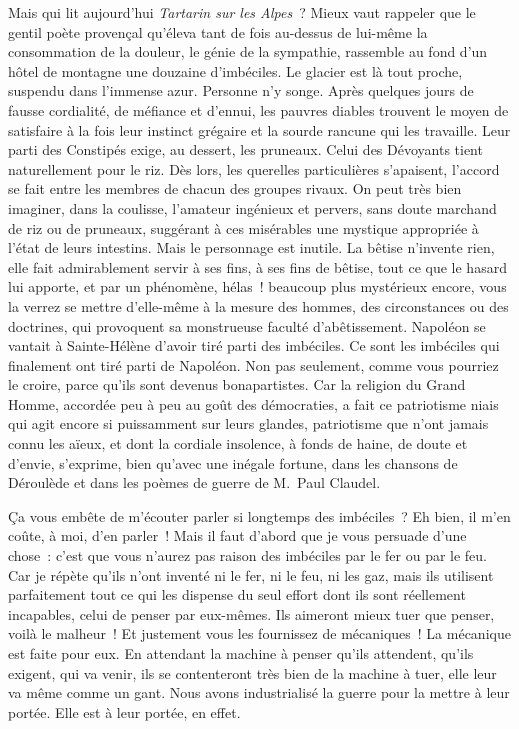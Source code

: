 \documentclass[french,twoside]{book} %
\begin{document}
Mais qui lit aujourd’hui \emph{Tartarin sur les Alpes} ? Mieux vaut rappeler que le gentil poète provençal qu’éleva tant de fois au-dessus de lui-même la consommation de la douleur, le génie de la sympathie, rassemble au fond d’un hôtel de montagne une douzaine d’imbéciles. Le glacier est là tout proche, suspendu dans l’immense azur. Personne n’y songe. Après quelques jours de fausse cordialité, de méfiance et d’ennui, les pauvres diables trouvent le moyen de satisfaire à la fois leur instinct grégaire et la sourde rancune qui les travaille. Leur parti des Constipés exige, au dessert, les pruneaux. Celui des Dévoyants tient naturellement pour le riz. Dès lors, les querelles particulières s’apaisent, l’accord se fait entre les membres de chacun des groupes rivaux. On peut très bien imaginer, dans la coulisse, l’amateur ingénieux et pervers, sans doute marchand de riz ou de pruneaux, suggérant à ces misérables une mystique appropriée à l’état de leurs intestins. Mais le personnage est inutile. La bêtise n’invente rien, elle fait admirablement servir à ses fins, à ses fins de bêtise, tout ce que le hasard lui apporte, et par un phénomène, hélas ! beaucoup plus mystérieux encore, vous la verrez se mettre d’elle-même à la mesure des hommes, des circonstances ou des doctrines, qui provoquent sa monstrueuse faculté d’abêtissement. Napoléon se vantait à Sainte-Hélène d’avoir tiré parti des imbéciles. Ce sont les imbéciles qui finalement ont tiré parti de Napoléon. Non pas seulement, comme vous pourriez le croire, parce qu’ils sont devenus bonapartistes. Car la religion du Grand Homme, accordée peu à peu au goût des démocraties, a fait ce patriotisme niais qui agit encore si puissamment sur leurs glandes, patriotisme que n’ont jamais connu les aïeux, et dont la cordiale insolence, à fonds de haine, de doute et d’envie, s’exprime, bien qu’avec une inégale fortune, dans les chansons de Déroulède et dans les poèmes de guerre de M. Paul Claudel.\par
Ça vous embête de m’écouter parler si longtemps des imbéciles ? Eh bien, il m’en coûte, à moi, d’en parler ! Mais il faut d’abord que je vous persuade d’une chose : c’est que vous n’aurez pas raison des imbéciles par le fer ou par le feu. Car je répète qu’ils n’ont inventé ni le fer, ni le feu, ni les gaz, mais ils utilisent parfaitement tout ce qui les dispense du seul effort dont ils sont réellement incapables, celui de penser par eux-mêmes. Ils aimeront mieux tuer que penser, voilà le malheur ! Et justement vous les fournissez de mécaniques ! La mécanique est faite pour eux. En attendant la machine à penser qu’ils attendent, qu’ils exigent, qui va venir, ils se contenteront très bien de la machine à tuer, elle leur va même comme un gant. Nous avons industrialisé la guerre pour la mettre à leur portée. Elle est à leur portée, en effet.\par
\end{document}
